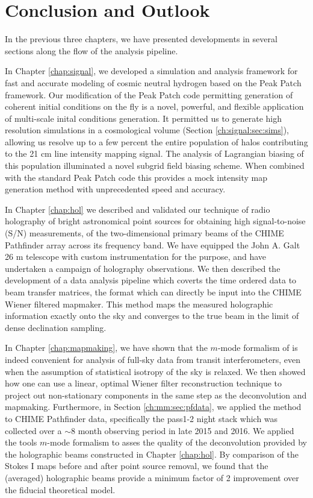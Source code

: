 \chapter{Conclusion and Outlook}
\label{chap:conclusion}

In the previous three chapters, we have presented developments in several sections along the flow of the analysis pipeline.

In Chapter \ref{chap:signal}, we developed a simulation and analysis framework for fast and accurate modeling of cosmic neutral hydrogen based on the Peak Patch framework. Our modification of the Peak Patch code permitting generation of coherent initial conditions on the fly is a novel, powerful, and flexible application of multi-scale inital conditions generation. It permitted us to generate high resolution simulations in a cosmological volume (Section \ref{ch:signal:sec:sims}), allowing us resolve up to a few percent the entire population of halos contributing to the 21 cm line intensity mapping signal. The analysis of Lagrangian biasing of this population illuminated a novel subgrid field biasing scheme. When combined with the standard Peak Patch code this provides a mock intensity map generation method with unprecedented speed and accuracy.

In Chapter \ref{chap:hol} we described and validated our technique of radio holography of bright astronomical point sources for obtaining high signal-to-noise (S/N) measurements, of the two-dimensional primary beams of the CHIME Pathfinder array across its frequency band. We have equipped the John A. Galt 26 m telescope with custom instrumentation for the purpose, and have undertaken a campaign of holography observations. We then described the development of a data analysis pipeline which coverts the time ordered data to beam transfer matrices, the format which can directly be input into the CHIME Wiener filtered mapmaker. This method maps the measured holographic information exactly onto the sky and converges to the true beam in the limit of dense declination sampling.

In Chapter \ref{chap:mapmaking}, we have shown that the $m$-mode formalism of \cite{mmodes1, mmodes2} is indeed convenient for analysis of full-sky data from transit interferometers, even when the assumption of statistical isotropy of the sky is relaxed. We then showed how one can use a linear, optimal Wiener filter reconstruction technique to project out non-stationary components in the same step as the deconvolution and mapmaking. Furthermore, in Section \ref{ch:mm:sec:pfdata}, we applied the method to CHIME Pathfinder data, specifically the pass1-2 night stack which was collected over a $\sim$8 month observing period in late 2015 and 2016. We applied the tools $m$-mode formalism to asses the quality of the deconvolution provided by the holographic beams constructed in Chapter \ref{chap:hol}. By comparison of the Stokes I maps before and after point source removal, we found that the (averaged) holographic beams provide a minimum factor of 2 improvement over the fiducial theoretical model.

